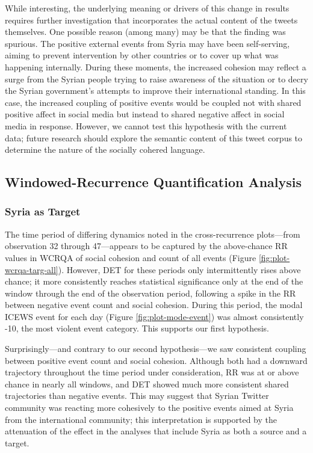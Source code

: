\documentclass[
  english,
  man]{apa6}
\begin{document}
While interesting, the underlying meaning or drivers of this change in results
requires further investigation that incorporates the actual content of the
tweets themselves. One possible reason (among many) may be that the finding was
spurious. The positive external events from Syria may have been self-serving,
aiming to prevent intervention by other countries or to cover up what was
happening internally. During these moments, the increased cohesion may reflect a
surge from the Syrian people trying to raise awareness of the situation or to
decry the Syrian government's attempts to improve their international standing.
In this case, the increased coupling of positive events would be coupled not
with shared positive affect in social media but instead to shared negative
affect in social media in response. However, we cannot test this hypothesis with
the current data; future research should explore the semantic content of this
tweet corpus to determine the nature of the socially cohered language.

\hypertarget{windowed-recurrence-quantification-analysis}{%
\subsection{Windowed-Recurrence Quantification Analysis}\label{windowed-recurrence-quantification-analysis}}

\hypertarget{syria-as-target-3}{%
\subsubsection{Syria as Target}\label{syria-as-target-3}}

The time period of differing dynamics noted in the cross-recurrence plots---from
observation 32 through 47---appears to be captured by the above-chance RR values
in WCRQA of social cohesion and count of all events (Figure
\ref{fig:plot-wcrqa-targ-all}). However, DET for these periods only
intermittently rises above chance; it more consistently reaches statistical
significance only at the end of the window through the end of the observation
period, following a spike in the RR between negative event count and social
cohesion. During this period, the modal ICEWS event for each day (Figure
\ref{fig:plot-mode-event}) was almost consistently -10, the most violent event
category. This supports our first hypothesis.

Surprisingly---and contrary to our second hypothesis---we saw consistent
coupling between positive event count and social cohesion. Although both had a
downward trajectory throughout the time period under consideration, RR was at or
above chance in nearly all windows, and DET showed much more consistent shared
trajectories than negative events. This may suggest that Syrian Twitter
community was reacting more cohesively to the positive events aimed at Syria
from the international community; this interpretation is supported by the
attenuation of the effect in the analyses that include Syria as both a source
and a target.
\end{document}
